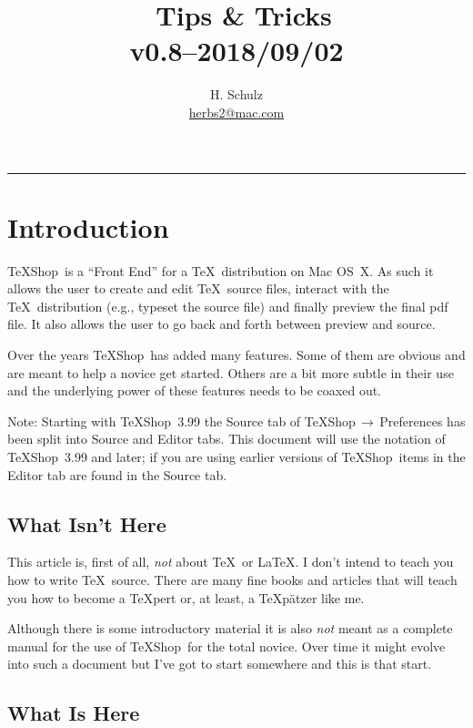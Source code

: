 \documentclass[letterpaper,11pt]{article}
\title{\TS\ Tips \& Tricks\\\small v0.8--2018/09/02}
\author{H. Schulz
\\\small\href{mailto:herbs2@mac.com}{herbs2@mac.com}}
\date{}
\newcommand{\TS}{\textsf{\TeX Shop}}
\newcommand{\acr}[1]{\textsf{#1}}
\newcommand{\cmd}[1]{\textsf{#1}}
\newcommand{\mnu}[1]{\textsf{#1}}
\newcommand{\To}{\,\(\to\)\,}
\begin{document}
\maketitle
\tableofcontents

\begin{center}
\rule{0.5\textwidth}{1pt}
\end{center}

\section{Introduction}

\TS\ is a ``Front End'' for a \TeX\ distribution on \cmd{Mac OS~X}. As such it allows the user to create and edit \TeX\ source files, interact with the \TeX\ distribution (e.g., typeset the source file) and finally preview the final \acr{pdf} file. It also allows the user to go back and forth between preview and source.

Over the years \TS\ has added many features. Some of them are obvious and are meant to help a novice get started. Others are a bit more subtle in their use and the underlying power of these features needs to be coaxed out.

Note: Starting with \TS\ 3.99 the \mnu{Source} tab of \mnu{TeXShop}\To\mnu{Preferences} has been split into  \mnu{Source} and \mnu{Editor} tabs. This document will use the notation of \TS\ 3.99 and later; if you are using earlier versions of \TS\ items in the \mnu{Editor} tab are found in the \mnu{Source} tab.

\subsection{What Isn't Here}

This article is, first of all, \emph{not} about \TeX\ or \LaTeX. I don't intend to teach you how to write \TeX\ source. There are many fine books and articles that will teach you how to become a \TeX pert or, at least, a \TeX pätzer like me.

Although there is some introductory material it is also \emph{not} meant as a complete manual for the use of \TS\ for the total novice. Over time it might evolve into such a document but I've got to start somewhere and this is that start.

\subsection{What Is Here}
\end{document}
